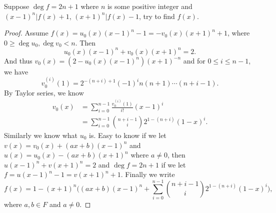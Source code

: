 \begin{pro}%
	Suppose $\deg f=2n+1$ where $n$ is some positive integer and $(x-1)^n|f(x)+1$, $(x+1)^n|f(x)-1$, try to find $f(x)$.
\end{pro}
\begin{proof}
	Assume $f(x)=u_0(x)(x-1)^n-1=-v_0(x)(x+1)^n+1$, where $0\geq \deg u_0,\deg v_0<n$. Then
	\[u_0(x)(x-1)^n+v_0(x)(x+1)^n=2.\]
	And thus $v_0(x)=(2-u_0(x)(x-1)^n)(x+1)^{-n}$ and for $0\leq i\leq n-1$, we have
	\[v_0^{(i)}(1)=2^{-(n+i)+1}(-1)^i n(n+1)\cdots(n+i-1).\]
	By Taylor series, we know
	\begin{align*}
	v_0(x)&=\sum_{i=0}^{n-1}\frac{v_0^{(i)}(1)}{i!} (x-1)^i\\
		  &=\sum_{i=0}^{n-1}\binom{n+i-1}{i} 2^{1-(n+i)} (1-x)^i.
	\end{align*}
	Similarly we know what $u_0$ is.
	Easy to know if we let $v(x)=v_0(x)+(ax+b)(x-1)^n$ and $u(x)=u_0(x)-(ax+b)(x+1)^n$ where $a\neq 0$, then $u(x-1)^n+v(x+1)^n=2$ and $\deg f=2n+1$ if we let $f=u(x-1)^n-1=v(x+1)^n+1$. Finally we write 
	\[f(x)=1-(x+1)^n\bigg((ax+b)(x-1)^n+\sum_{i=0}^{n-1}\binom{n+i-1}{i} 2^{1-(n+i)} (1-x)^i\bigg),\] where $a,b\in F$ and $a\neq 0$.
\end{proof}

